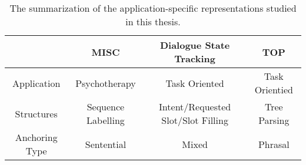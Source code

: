 \begin{table}[ht]
  \begin{center}
\setlength{\tabcolsep}{4pt}
{\small
\begin{tabular}{c|c|c|c}
\toprule
\hline
               & MISC               & Dialogue State Tracking            & TOP            \\ \hline
Application    & Psychotherapy      & Task Oriented                      & Task Orientied \\
Structures     & Sequence Labelling & Intent/Requested Slot/Slot Filling & Tree Parsing   \\
Anchoring Type & Sentential         & Mixed                              & Phrasal        \\
\hline
\bottomrule

\end{tabular}}
\end{center}
\caption{The summarization of the application-specific representations studied in this thesis.}
\label{tbl:app-rep}
\end{table}



